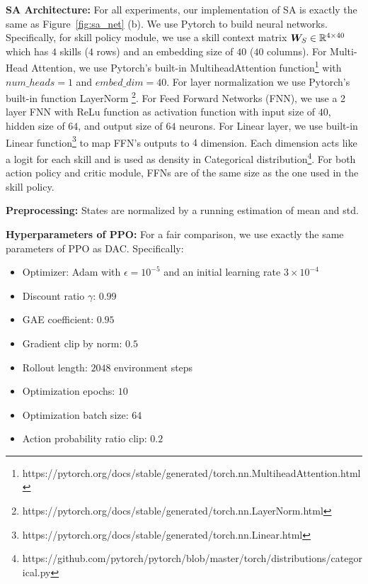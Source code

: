 \textbf{SA Architecture:} For all experiments, our implementation
of SA is exactly the same as Figure~\ref{fig:sa_net} (b). We use
Pytorch to build neural networks. Specifically, for skill policy
module, we use a skill context matrix ${\bm{W}}_S\in {\mathbb{R}}^{4\times 40}$
which has $4$ skills ($4$ rows) and an embedding size of $40$
($40$ columns). For Multi-Head Attention, we use Pytorch's
built-in MultiheadAttention
function\footnote{https://pytorch.org/docs/stable/generated/torch.nn.MultiheadAttention.html}
with $num\_heads=1$ and $embed\_dim=40$. For layer normalization
we use Pytorch's built-in function LayerNorm
\footnote{https://pytorch.org/docs/stable/generated/torch.nn.LayerNorm.html}.
For Feed Forward Networks (FNN), we use a 2 layer FNN with ReLu
function as activation function with input size of $40$, hidden
size of $64$, and output size of $64$ neurons. For Linear layer,
we use built-in Linear
function\footnote{https://pytorch.org/docs/stable/generated/torch.nn.Linear.html}
to map FFN's outputs to $4$ dimension. Each dimension acts like a
logit for each skill and is used as density in Categorical
distribution\footnote{https://github.com/pytorch/pytorch/blob/master/torch/distributions/categorical.py}.
For both action policy and critic module, FFNs are of the same
size as the one used in the skill policy.

\textbf{Preprocessing:} States are normalized by a running
estimation of mean and std.


\textbf{Hyperparameters of PPO:} For a fair comparison, we use
exactly the same parameters of PPO as DAC. Specifically:
\begin{itemize}
\item Optimizer: Adam with $\epsilon= 10^{-5}$ and an initial
  learning rate $3 \times 10^{-4}$

\item Discount ratio $\gamma$: $0.99$

\item GAE coefficient: $0.95$

\item Gradient clip by norm: $0.5$

\item Rollout length: $2048$ environment steps

\item Optimization epochs: $10$

\item Optimization batch size: $64$

\item Action probability ratio clip: $0.2$
\end{itemize}



